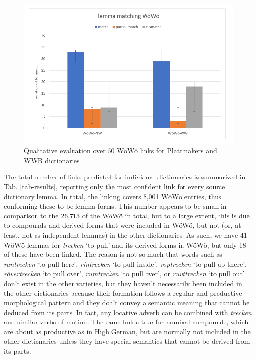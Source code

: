 \documentclass[11pt]{article}
\newcommand{\word}[1]{\textsl{#1}} %
\begin{document}
\begin{figure}
    \centering
    \includegraphics[width=1\linewidth]{lemma-matching-woewoe.png}
    \caption{Qualitative evaluation over 50 WöWö links for Plattmakers and WWB dictionaries}
    \label{fig-eval}
\end{figure}


The total number of links predicted for individual dictionaries is summarized in Tab. \ref{tab-results}, reporting only the most confident link for every source dictionary lemma.
In total, the linking covers 8,001 WöWö entries, thus conforming these to be lemma forms. This number appears to be small in comparison to the 26,713 of the WöWö in total, but to a large extent, this is due to compounds and derived forms that were included in WöWö, but not (or, at least, not as independent lemmas) in the other dictionaries. As such, we have 41 WöWö lemmas for \word{trecken} `to pull' and its derived forms in WöWö, but only 18 of these have been linked. The reason is not so much that words such as \word{rantrecken} `to pull here', \word{rintrecken} `to pull inside', \word{roptrecken} `to pull up there', \word{rövertrecken} `to pull over', \word{rumtrecken} `to pull over', or \word{ruuttrecken} `to pull out' don't exist in the other varieties, but they haven't necessarily been included in the other dictionaries because their formation follows a regular and productive morphological pattern and they don't convey a semantic meaning that cannot be deduced from its parts. In fact, any locative adverb can be combined with \word{trecken} and similar verbs of motion. The same holds true for nominal compounds, which are about as productive as in High German, but are normally not included in the other dictionaries unless they have special semantics that cannot be derived from its parts.
\end{document}

